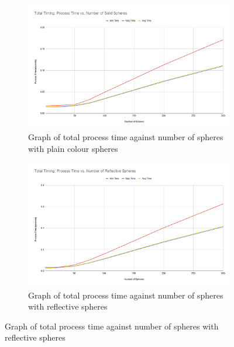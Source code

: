 \documentclass[final]{cmpreport}
\begin{document}
\begin{figure}
    \centering
    \begin{subfigure}{0.5\textwidth}
        \centering
        \includegraphics[width=\linewidth]{img/Total Timing Process Time vs. Number of Solid Spheres.png}
        \caption{Graph of total process time against number of spheres with plain colour spheres}
        \label{graphsolidspheretotal}
    \end{subfigure}%
    \begin{subfigure}{0.5\textwidth}
        \centering
        \includegraphics[width=\linewidth]{img/Total Timing Process Time vs. Number of Reflective Spheres.png}
        \caption{Graph of total process time against number of spheres with reflective spheres}
        \label{graphreflectspheretotal}
    \end{subfigure}
\end{figure}
\end{document}
